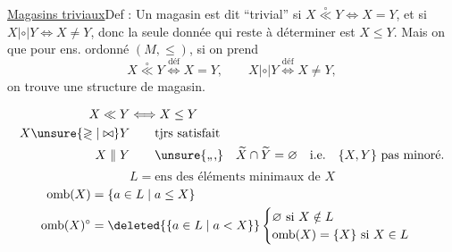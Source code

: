 \uline{Magasins triviaux}\quad Def : Un magasin est dit ``trivial'' si $X\overset{\circ}{\ll}Y\Longleftrightarrow X=Y$, et si $X\mathrel{|\circ|}Y\Longleftrightarrow X\ne Y$, donc la seule donnée qui reste à déterminer est $X\leq Y$. Mais on   que pour  ens. ordonné $(M,\leq)$, si on prend 
\[
X\overset{\circ}{\ll}Y\overset{\text{déf}}{\Longleftrightarrow}X=Y,\qquad X\mathrel{|\circ|}Y\overset{\text{déf}}{\Longleftrightarrow}X\ne Y,
\]
on trouve une structure de magasin.

  

\[
\begin{aligned}
X\ll Y&\Longleftrightarrow X\leq Y\\
X\unsure{\gtrless|\bowtie}Y&\qquad\text{tjrs satisfait}\\
X\parallel Y&\qquad\text{\unsure{,,,}}\quad\widetilde X\cap\widetilde Y=\varnothing\quad\text{i.e.}\quad\{X,Y\}\text{ pas minoré}.
\end{aligned}
\]
\[
L=\text{ens des éléments minimaux de }X
\]
\[
\begin{aligned}
\mathrm{omb}(X)&=\{a\in L\mid a\leq X\}\\
\mathrm{omb}(X)^\circ&=\deleted{\{a\in L\mid a<X\}}\begin{cases}\varnothing\text{ si }X\notin L\\\mathrm{omb}(X)=\{X\}\text{ si }X\in L\end{cases}
\end{aligned}
\]


